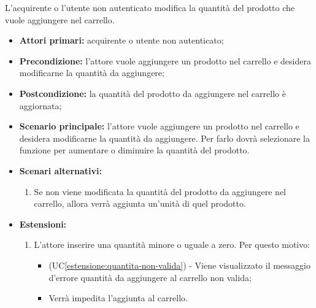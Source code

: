 L'acquirente o l'utente non autenticato modifica la quantità del prodotto che vuole aggiungere nel carrello.
\begin{itemize}
	\item \textbf{Attori primari:} acquirente o utente non autenticato;
	\item \textbf{Precondizione:} l'attore vuole aggiungere un prodotto nel carrello e desidera modificarne la quantità da aggiungere;
	\item \textbf{Postcondizione:} la quantità del prodotto da aggiungere nel carrello è aggiornata;
	\item \textbf{Scenario principale:} l'attore vuole aggiungere un prodotto nel carrello e desidera modificarne la quantità da aggiungere. Per farlo dovrà selezionare la funzione per aumentare o diminuire la quantità del prodotto.
	\item \textbf{Scenari alternativi:}
	\begin{enumerate}[label=\lett]
        \item Se non viene modificata la quantità del prodotto da aggiungere nel carrello, allora verrà aggiunta un'unità di quel prodotto.
    \end{enumerate}
	\item \textbf{Estensioni:}
	\begin{enumerate}[label=\lett]
        \item L'attore inserire una quantità minore o uguale a zero. Per questo motivo:
        \begin{itemize}
            \item (UC\ref{estensione:quantita-non-valida}) - Viene visualizzato il messaggio d'errore quantità da aggiungere al carrello non valida;
            \item Verrà impedita l'aggiunta al carrello.
        \end{itemize}
	\end{enumerate}
\end{itemize}

